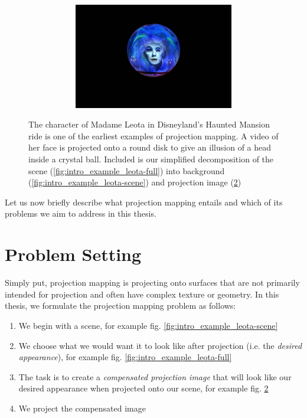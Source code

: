 \begin{figure}[ht]
\begin{subfigure}{0.39\textwidth}
        \begin{subfigure}{\textwidth}
            \centering
            \includegraphics[width=\textwidth]{images/01-Leota-only_head.jpg}
            \caption{}
            \label{fig:intro_example_leota-head}
        \end{subfigure}
    \end{subfigure}
    \caption{The character of Madame Leota in Disneyland's Haunted Mansion ride is one of the earliest examples of projection mapping. A video of her face is projected onto a round disk to give an illusion of a head inside a crystal ball. Included is our simplified decomposition of the scene (\ref{fig:intro_example_leota-full}) into background (\ref{fig:intro_example_leota-scene}) and projection image (\ref{fig:intro_example_leota-head})}
    \label{fig:intro_example_leota}
\end{figure}

Let us now briefly describe what projection mapping entails and which of its problems we aim to address in this thesis.

\section{Problem Setting}
\label{section:intro-problem_setting}

Simply put, projection mapping is projecting onto surfaces that are not primarily intended for projection and often have complex texture or geometry. In this thesis, we formulate the projection mapping problem as follows:

\begin{enumerate}
    \item We begin with a scene, for example fig. \ref{fig:intro_example_leota-scene}
    \item We choose what we would want it to look like after projection (i.e. the \textit{desired appearance}), for example fig. \ref{fig:intro_example_leota-full}
    \item The task is to create a \textit{compensated projection image} that will look like our desired appearance when projected onto our scene, for example fig. \ref{fig:intro_example_leota-head}
    \item We project the compensated image
\end{enumerate}

